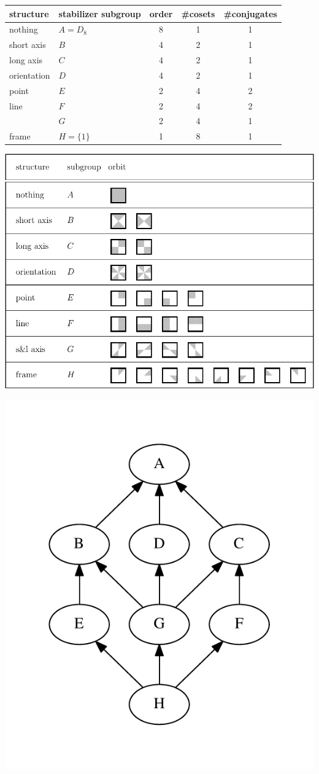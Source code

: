 \documentclass[11pt,oneside]{article}
\begin{document}
\begin{samepage}
\begin{center}
\begin{tabular}{ |l|l|c|c|c| }
\hline
structure & stabilizer subgroup & order & \#cosets & \#conjugates \\
\hline
\hline
nothing & $A=D_8$ &       8        &  1      &   1         \\
\hline
short axis& $B$ &       4        &  2      &   1         \\
\hline
long axis & $C$ &       4        &  2      &   1         \\
\hline
orientation & $D$ &       4        &  2      &   1         \\
\hline
point & $E$ &       2        &  4      &   2         \\
\hline
line  & $F$ &       2        &  4      &   2         \\
\hline
        & $G$ &       2        &  4      &   1         \\
\hline
frame & $H=\{1\} $ &       1        &  8      &   1         \\
\hline
\end{tabular}
\end{center}
\end{samepage}

\begin{center}
\includegraphics[]{pic-square-structures.pdf} 
\end{center}

\begin{center}
\includegraphics[width=0.4\columnwidth]{subgroups_d8.pdf} 
\end{center}
\end{document}
